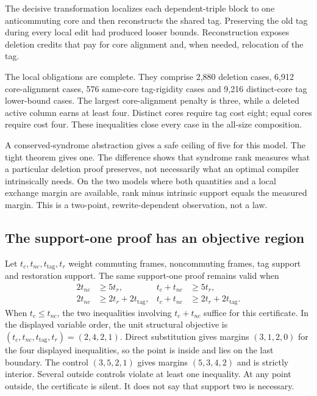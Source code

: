 The decisive transformation localizes each dependent-triple block to one anticommuting core and then reconstructs the shared tag.  Preserving the old tag during every local edit had produced looser bounds.  Reconstruction exposes deletion credits that pay for core alignment and, when needed, relocation of the tag.

The local obligations are complete.  They comprise 2,880 deletion cases, 6,912 core-alignment cases, 576 same-core tag-rigidity cases and 9,216 distinct-core tag lower-bound cases.  The largest core-alignment penalty is three, while a deleted active column earns at least four.  Distinct cores require tag cost eight; equal cores require cost four.  These inequalities close every case in the all-size composition.

A conserved-syndrome abstraction gives a safe ceiling of five for this model.  The tight theorem gives one.  The difference shows that syndrome rank measures what a particular deletion proof preserves, not necessarily what an optimal compiler intrinsically needs.  On the two models where both quantities and a local exchange margin are available, rank minus intrinsic support equals the measured margin.  This is a two-point, rewrite-dependent observation, not a law.

\subsection{The support-one proof has an objective region}

Let $t_c,t_{nc},t_{\mathrm{tag}},t_r$ weight commuting frames, noncommuting frames, tag support and restoration support.  The same support-one proof remains valid when
\begin{align}
2t_{nc} &\geq 5t_r, & t_c+t_{nc} &\geq 5t_r,\\
2t_{nc} &\geq 2t_r+2t_{\mathrm{tag}}, &
t_c+t_{nc} &\geq 2t_r+2t_{\mathrm{tag}}.
\end{align}
When $t_c\leq t_{nc}$, the two inequalities involving $t_c+t_{nc}$ suffice for this certificate.  In the displayed variable order, the unit structural objective is $(t_c,t_{nc},t_{\mathrm{tag}},t_r)=(2,4,2,1)$.  Direct substitution gives margins $(3,1,2,0)$ for the four displayed inequalities, so the point is inside and lies on the last boundary.  The control $(3,5,2,1)$ gives margins $(5,3,4,2)$ and is strictly interior.  Several outside controls violate at least one inequality.  At any point outside, the certificate is silent.  It does not say that support two is necessary.

